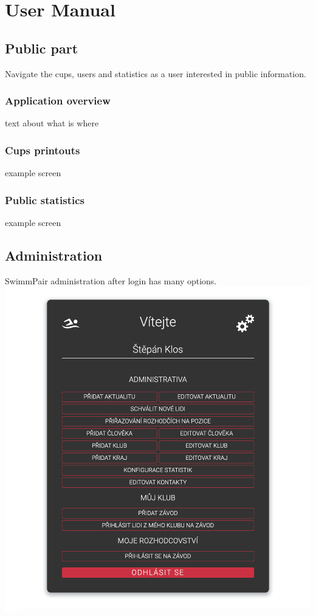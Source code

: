 \chapter{User Manual}
\section{Public part}
Navigate the cups, users and statistics as a user interested in public information.
\subsection*{Application overview}
text about what is where
\subsection*{Cups printouts}
example screen
\subsection*{Public statistics}
example screen

\section{Administration}
SwimmPair administration after login has many options.
\newline
\includegraphics[scale=0.430]{img/admin_menu.png}
